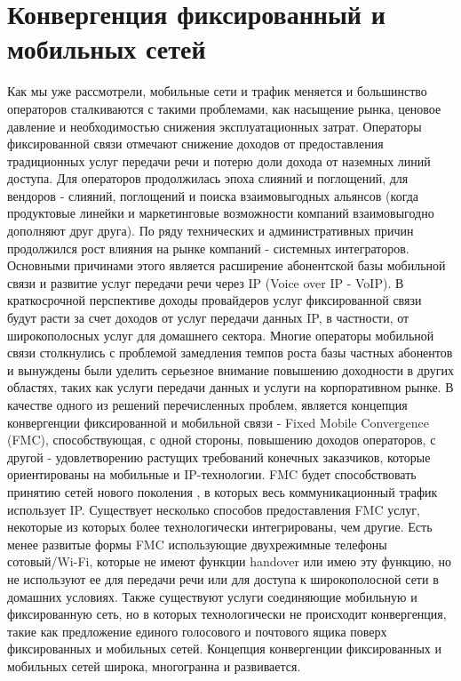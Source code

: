 \section{Конвергенция фиксированный и мобильных сетей} \label{sect1_1}
Как мы уже рассмотрели, мобильные сети и трафик меняется и большинство операторов сталкиваются с такими проблемами, как насыщение рынка, ценовое давление и необходимостью снижения эксплуатационных затрат.
Операторы фиксированной связи отмечают снижение доходов от предоставления традиционных услуг передачи речи и потерю доли дохода от наземных линий доступа. Для операторов продолжилась эпоха слияний и поглощений, для вендоров - слияний, поглощений и поиска взаимовыгодных альянсов (когда продуктовые линейки и маркетинговые возможности компаний взаимовыгодно дополняют друг друга). По ряду технических и административных причин продолжился рост влияния на рынке компаний - системных интеграторов. Основными причинами этого является расширение абонентской базы мобильной связи и развитие услуг передачи речи через IP (Voice over IP - VoIP). В краткосрочной перспективе доходы провайдеров услуг фиксированной связи будут расти за счет доходов от услуг передачи данных IP, в частности, от широкополосных услуг для домашнего сектора.  Многие операторы мобильной связи столкнулись с проблемой замедления темпов роста базы частных абонентов и вынуждены были уделить серьезное внимание повышению доходности в других областях, таких как услуги передачи данных и услуги на корпоративном рынке. В качестве одного из решений перечисленных проблем, является концепция конвергенции фиксированной и мобильной связи - Fixed Mobile Convergence (FMC), способствующая, с одной стороны, повышению доходов операторов, с другой - удовлетворению растущих требований конечных заказчиков, которые ориентированы на мобильные и IP-технологии. FMC будет способствовать принятию сетей нового поколения \cite{FMC}, в которых весь коммуникационный трафик использует IP.
Существует несколько способов предоставления FMC услуг, некоторые из которых более технологически интегрированы, чем другие. Есть менее развитые формы FMC использующие двухрежимные телефоны сотовый/Wi-Fi, которые не имеют функции handover или имею эту функцию, но не используют ее для передачи речи или для доступа к широкополосной сети в домашних условиях. Также существуют услуги соединяющие мобильную и фиксированную сеть, но в которых технологически не происходит конвергенция, такие как предложение единого голосового и почтового ящика поверх фиксированных и мобильных сетей.
Концепция конвергенции фиксированных и мобильных сетей широка, многогранна и развивается. 


